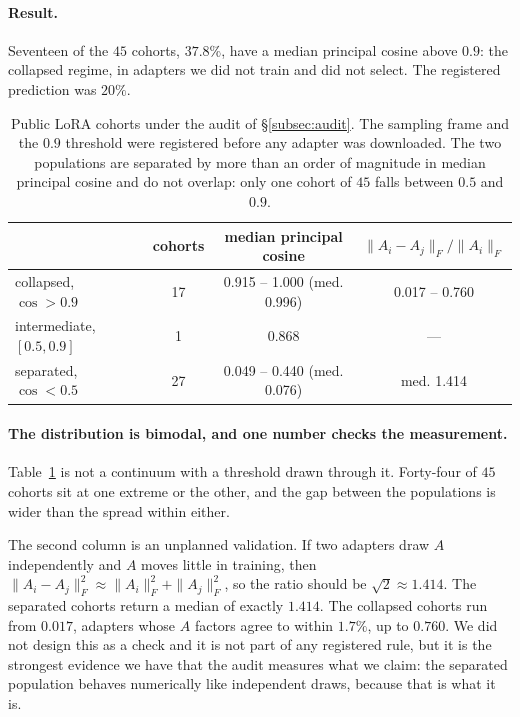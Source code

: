 \paragraph{Result.} Seventeen of the $45$ cohorts, \textbf{$37.8\%$}, have a
median principal cosine above $0.9$: the collapsed regime, in adapters we did
not train and did not select. The registered prediction was $20\%$.

\begin{table}[tb]
\centering
\small
\caption{Public LoRA cohorts under the audit of \S\ref{subsec:audit}. The
sampling frame and the $0.9$ threshold were registered before any adapter was
downloaded. The two populations are separated by more than an order of
magnitude in median principal cosine and do not overlap: only one cohort of
$45$ falls between $0.5$ and $0.9$.}
\label{tab:prevalence}
\begin{tabular}{lccc}
\toprule
 & cohorts & median principal cosine & $\|A_i - A_j\|_F/\|A_i\|_F$ \\
\midrule
collapsed, $\cos > 0.9$      & 17 & 0.915 -- 1.000 (med. 0.996) & 0.017 -- 0.760 \\
intermediate, $[0.5, 0.9]$   & 1  & 0.868 & --- \\
separated, $\cos < 0.5$      & 27 & 0.049 -- 0.440 (med. 0.076) & med. 1.414 \\
\bottomrule
\end{tabular}
\end{table}

\paragraph{The distribution is bimodal, and one number checks the
measurement.} Table~\ref{tab:prevalence} is not a continuum with a threshold
drawn through it. Forty-four of $45$ cohorts sit at one extreme or the other,
and the gap between the populations is wider than the spread within either.

The second column is an unplanned validation. If two adapters draw $A$
independently and $A$ moves little in training, then
$\|A_i - A_j\|_F^2 \approx \|A_i\|_F^2 + \|A_j\|_F^2$, so the ratio should be
$\sqrt 2 \approx 1.414$. The separated cohorts return a median of exactly
$1.414$. The collapsed cohorts run from $0.017$, adapters whose $A$ factors
agree to within $1.7\%$, up to $0.760$. We did not design this as a check and
it is not part of any registered rule, but it is the strongest evidence we have
that the audit measures what we claim: the separated population behaves
numerically like independent draws, because that is what it is.

